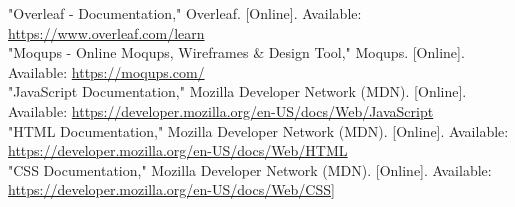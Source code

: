\documentclass[conference]{IEEEtran}
\begin{document}
\begin{thebibliography}{00}
 "Overleaf - Documentation," Overleaf. [Online]. Available: \url{https://www.overleaf.com/learn}\\
 "Moqups - Online Moqups, Wireframes \& Design Tool," Moqups. [Online]. Available: \url{https://moqups.com/}\\
 "JavaScript Documentation," Mozilla Developer Network (MDN). [Online]. Available: \url{https://developer.mozilla.org/en-US/docs/Web/JavaScript}\\
 "HTML Documentation," Mozilla Developer Network (MDN). [Online]. Available: \url{https://developer.mozilla.org/en-US/docs/Web/HTML}\\
 "CSS Documentation," Mozilla Developer Network (MDN). [Online]. Available: \url{https://developer.mozilla.org/en-US/docs/Web/CSS]}\\
\end{thebibliography}
\end{document}
